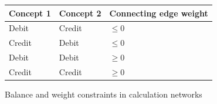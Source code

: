 \begin{figure}[H]
    \label{fig:balance_weight_constraints}
    \centering
    \begin{tabular}{|l|l|l|}
        \hline
        \textbf{Concept 1} & \textbf{Concept 2} & \textbf{Connecting edge weight} \\ \hline
        Debit              & Credit             & $\leq 0$        \\ \hline
        Credit             & Debit              & $\leq 0$        \\ \hline
        Debit              & Debit              & $\geq 0$        \\ \hline
        Credit             & Credit             & $\geq 0$        \\ \hline
    \end{tabular}
    \caption{Balance and weight constraints in calculation networks}
\end{figure}







